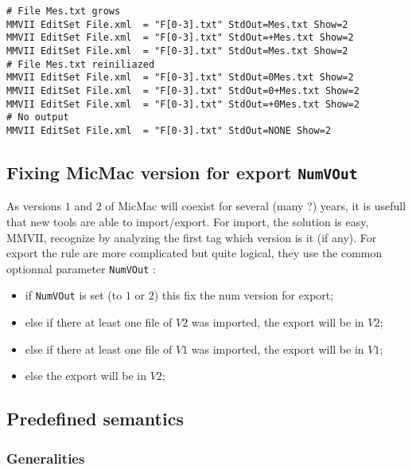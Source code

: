 \documentclass[a4paper]{book}
\newcommand{\PPP}{MMVII}
\begin{document}
\begin{verbatim}
# File Mes.txt grows
MMVII EditSet File.xml  = "F[0-3].txt" StdOut=Mes.txt Show=2
MMVII EditSet File.xml  = "F[0-3].txt" StdOut=+Mes.txt Show=2
MMVII EditSet File.xml  = "F[0-3].txt" StdOut=Mes.txt Show=2
# File Mes.txt reiniliazed
MMVII EditSet File.xml  = "F[0-3].txt" StdOut=0Mes.txt Show=2
MMVII EditSet File.xml  = "F[0-3].txt" StdOut=0+Mes.txt Show=2
MMVII EditSet File.xml  = "F[0-3].txt" StdOut=+0Mes.txt Show=2
# No output
MMVII EditSet File.xml  = "F[0-3].txt" StdOut=NONE Show=2
\end{verbatim}




\subsection{Fixing MicMac version for export {\tt NumVOut}}

As versions $1$ and $2$ of MicMac will coexist for several (many ?) years,
it is usefull that new tools are able to import/export. For import, the solution
is easy, \PPP, recognize by analyzing the first tag which version is it (if any).
For export the rule are more complicated but quite logical, they use the common
optionnal parameter {\tt NumVOut} :

\begin{itemize}
    \item if {\tt NumVOut} is set (to $1$ or $2$) this fix the num version for export;
    \item else if there at least one file of $V2$ was imported, the export will be in $V2$;
    \item else if there at least one file of $V1$ was imported, the export will be in $V1$;
    \item else  the export will be in $V2$;
\end{itemize}


\subsection{Predefined semantics}

\label{Param:Pred:Sem}


\subsubsection{Generalities}
\end{document}
